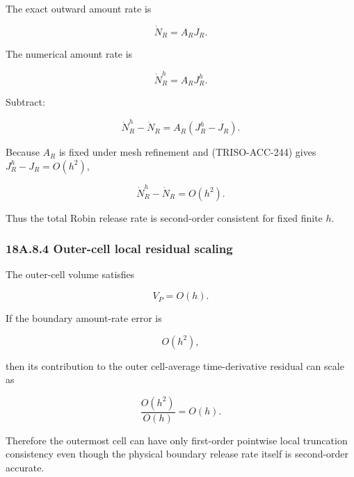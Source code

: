 \documentclass[11pt,a4paper]{article}
\begin{document}
The exact outward amount rate is

\begin{equation}
\dot N_R=A_RJ_R.
\tag{TRISO-ACC-246}
\label{eq:triso-acc-246}
\end{equation}

The numerical amount rate is

\begin{equation}
\dot N_R^h=A_RJ_R^h.
\tag{TRISO-ACC-247}
\label{eq:triso-acc-247}
\end{equation}

Subtract:

\begin{equation}
\dot N_R^h-\dot N_R
=
A_R(J_R^h-J_R).
\tag{TRISO-ACC-248}
\label{eq:triso-acc-248}
\end{equation}

Because $A_R$ is fixed under mesh refinement and (TRISO-ACC-244) gives $J_R^h-J_R=O(h^2)$,

\begin{equation}
\boxed{
\dot N_R^h-\dot N_R
=
O(h^2).
}
\tag{TRISO-ACC-249}
\label{eq:triso-acc-249}
\end{equation}

Thus the total Robin release rate is second-order consistent for fixed finite $h$.

\subsubsection*{18A.8.4 Outer-cell local residual scaling}

The outer-cell volume satisfies

\begin{equation}
V_P=O(h).
\tag{TRISO-ACC-250}
\label{eq:triso-acc-250}
\end{equation}

If the boundary amount-rate error is

\begin{equation}
O(h^2),
\tag{TRISO-ACC-251}
\label{eq:triso-acc-251}
\end{equation}

then its contribution to the outer cell-average time-derivative residual can scale as

\begin{equation}
\frac{O(h^2)}{O(h)}
=
O(h).
\tag{TRISO-ACC-252}
\label{eq:triso-acc-252}
\end{equation}

Therefore the outermost cell can have only first-order pointwise local truncation consistency even though the physical boundary release rate itself is second-order accurate.
\end{document}
